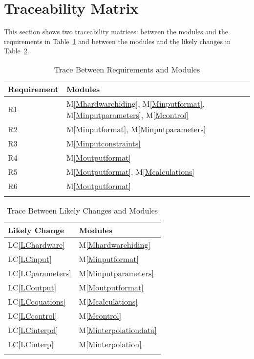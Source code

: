\documentclass[12pt]{article}
\begin{document}
\section{Traceability Matrix}
\label{Sec:TM}
This section shows two traceability matrices: between the modules and the requirements in Table~\ref{Table:TBRaM} and between the modules and the likely changes in Table~\ref{Table:TBLCaM}.
\begin{longtable}{l l}
\toprule
Requirement & Modules
\\
\midrule
R1 & M\ref{Mhardwarehiding}, M\ref{Minputformat}, M\ref{Minputparameters}, M\ref{Mcontrol}
\\
R2 & M\ref{Minputformat}, M\ref{Minputparameters}
\\
R3 & M\ref{Minputconstraints}
\\
R4 & M\ref{Moutputformat}
\\
R5 & M\ref{Moutputformat}, M\ref{Mcalculations}
\\
R6 & M\ref{Moutputformat}
\\
\bottomrule
\caption{Trace Between Requirements and Modules}
\label{Table:TBRaM}
\end{longtable}
\begin{longtable}{l l}
\toprule
Likely Change & Modules
\\
\midrule
LC\ref{LChardware} & M\ref{Mhardwarehiding}
\\
LC\ref{LCinput} & M\ref{Minputformat}
\\
LC\ref{LCparameters} & M\ref{Minputparameters}
\\
LC\ref{LCoutput} & M\ref{Moutputformat}
\\
LC\ref{LCequations} & M\ref{Mcalculations}
\\
LC\ref{LCcontrol} & M\ref{Mcontrol}
\\
LC\ref{LCinterpd} & M\ref{Minterpolationdata}
\\
LC\ref{LCinterp} & M\ref{Minterpolation}
\\
\bottomrule
\caption{Trace Between Likely Changes and Modules}
\label{Table:TBLCaM}
\end{longtable}
\end{document}
